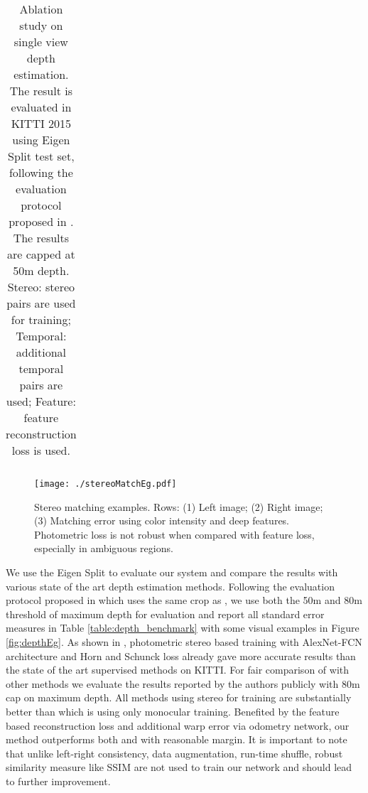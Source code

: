 \documentclass[10pt,twocolumn,letterpaper]{article}
\begin{document}
\begin{table*}[t]
\begin{center}
{\begin{tabular}{| l || c c c || c c c c| c c c|}
\hline

\end{tabular}
}
\end{center}
\caption{Ablation study on single view depth estimation. The result is evaluated in KITTI 2015 using Eigen Split test set, following the evaluation protocol proposed in \cite{godard2016depth}. The results are capped at 50m depth. Stereo: stereo pairs are used for training; Temporal: additional temporal pairs are used; Feature: feature reconstruction loss is used.
\vspace{-5mm}
}
\label{table:depth_ablation}
\end{table*}

\begin{figure} 
\centering
    \texttt{[image: ./stereoMatchEg.pdf]}
    \caption{Stereo matching examples. Rows: (1) Left image; (2) Right image; (3) Matching error using color intensity and deep features. Photometric loss is not robust when compared with feature loss, especially in ambiguous regions.}\label{fig:stereoMatchEg}
\end{figure}


We use the Eigen Split to evaluate our system and compare the results with various state of the art depth estimation methods. Following the evaluation protocol proposed in \cite{godard2016depth} which uses the same crop as \cite{garg2016depth}, 
we use both the 50m and 80m threshold of maximum depth for evaluation and report all standard error measures in Table \ref{table:depth_benchmark} with some visual examples in Figure \ref{fig:depthEg}.
As shown in \cite{garg2016depth}, photometric stereo based training with AlexNet-FCN architecture and Horn and Schunck \cite{horn1981determining} loss already gave more accurate results than the state of the art supervised methods \cite{eigen2014depth}\cite{liu2016depth} on KITTI. 
For fair comparison of \cite{garg2016depth} with other methods we evaluate the results reported by the authors publicly with 80m cap on maximum depth. 
All methods using stereo for training are substantially better than \cite{zhou2017sfmlearner} which is using only monocular training. 
Benefited by the feature based reconstruction loss and  additional warp error via odometry network, our method outperforms both \cite{garg2016depth} and \cite{godard2016depth} with reasonable margin. It is important to note that unlike \cite{godard2016depth} left-right consistency, data augmentation, run-time shuffle, robust similarity measure like SSIM\cite{wang2004image} are not used to train our network and should lead to further improvement.
\end{document}
